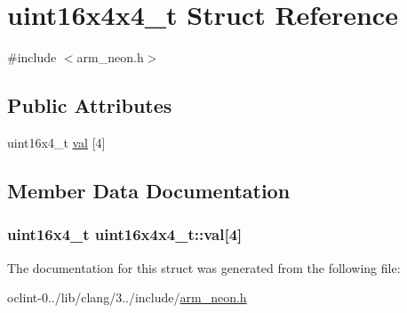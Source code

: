 \hypertarget{structuint16x4x4__t}{\section{uint16x4x4\-\_\-t Struct Reference}
\label{structuint16x4x4__t}
}


{\ttfamily \#include $<$arm\-\_\-neon.\-h$>$}

\subsection*{Public Attributes}
\begin{DoxyCompactItemize}
\item 
uint16x4\-\_\-t \hyperlink{structuint16x4x4__t_a146bb08879ecada88cf81dc0d5c2d8bd}{val} \mbox{[}4\mbox{]}
\end{DoxyCompactItemize}


\subsection{Member Data Documentation}
\hypertarget{structuint16x4x4__t_a146bb08879ecada88cf81dc0d5c2d8bd}{
\subsubsection[{val}]{\setlength{\rightskip}{0pt plus 5cm}uint16x4\-\_\-t uint16x4x4\-\_\-t\-::val\mbox{[}4\mbox{]}}}\label{structuint16x4x4__t_a146bb08879ecada88cf81dc0d5c2d8bd}


The documentation for this struct was generated from the following file\-:\begin{DoxyCompactItemize}
\item 
oclint-\/0../lib/clang/3../include/\hyperlink{arm__neon_8h}{arm\-\_\-neon.\-h}\end{DoxyCompactItemize}
